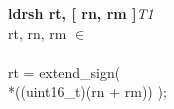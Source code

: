 


\begin{instructionblock}{\imagewidth}%
    \textbf{ldrsh rt, [ rn, rm ]}\hfill\textit{T1}\\
    rt, rn, rm $\in$ \baseregisters\\
    \\
    rt = extend\_sign(\\
    *((uint16\_t)(rn + rm)) );
\end{instructionblock}

